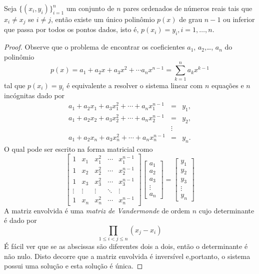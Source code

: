 \begin{teo}\label{teo:interp_poli} Seja $\{(x_i,y_i)\}_{i=1}^{n}$ um conjunto de $n$ pares ordenados de números reais tais que $x_i \ne x_j$ se $i\ne j$, então existe um único polinômio $p(x)$ de grau $n-1$ ou inferior que passa por todos os pontos dados, isto é, $p(x_i)=y_i, i=1,\ldots, n$.
\end{teo}
\begin{proof} Observe que o problema de encontrar os coeficientes $a_1$, $a_2$,\ldots, $a_n$ do polinômio
$$p(x)=a_1+a_2x+a_3x^2+\cdots a_nx^{n-1}=\sum_{k=1}^n a_k x^{k-1}$$
tal que $p(x_i)=y_i$ é equivalente a resolver o sistema linear com $n$ equações e $n$ incógnitas dado por
\begin{eqnarray*}
a_1+a_2x_1+a_3x_1^2+\cdots +a_n x_1^{n-1}&=&y_1,\\
a_1+a_2x_2+a_3x_2^2+\cdots +a_n x_2^{n-1}&=&y_2,\\
&\vdots&\\
a_1+a_2x_n+a_3x_n^2+\cdots +a_n x_n^{n-1}&=&y_n.
\end{eqnarray*}
O qual pode ser escrito na forma matricial como
$$\begin{bmatrix}
1 & x_1 & x_1^2 & \cdots & x_1^{n-1}\\
1 & x_2 & x_2^2 & \cdots & x_2^{n-1}\\
1 & x_3 & x_3^2 & \cdots & x_3^{n-1}\\
\vdots&\vdots&\vdots&\ddots&\vdots\\
1 & x_n & x_n^2 & \cdots & x_n^{n-1}
\end{bmatrix}
\begin{bmatrix}
a_1\\a_2\\a_3\\ \vdots \\a_n
\end{bmatrix}=
\begin{bmatrix}
y_1\\y_2\\y_3\\ \vdots \\y_n
\end{bmatrix}
$$
A matriz envolvida é uma \emph{matriz de Vandermonde} de ordem $n$ cujo determinante é dado por
$$\prod_{1\leq i<j\leq n}\left(x_j-x_i\right)$$
É fácil ver que se as abscissas são diferentes dois a dois, então o determinante é não nulo. Disto decorre que a matriz envolvida é inversível e,portanto, o sistema possui uma solução e esta solução é única.
\end{proof}

